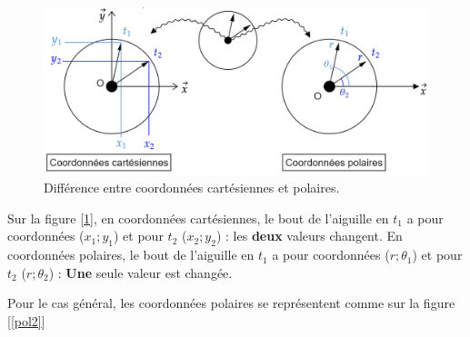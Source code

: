 \documentclass[
	11pt, %
	fleqn, %
	a4paper, %
]{LegrandOrangeBook}
\begin{document}
\begin{figure}[H] %
	\centering %
	\includegraphics[width=1\textwidth]{Images/pol1.png} %
	\caption{Différence entre coordonnées cartésiennes et polaires.}
	\label{pol1} %
\end{figure}

Sur la figure [\ref{pol1}], en coordonnées cartésiennes, le bout de l'aiguille en $t_1$ a pour coordonnées ($x_1; y_1$) et pour $t_2$ ($x_2 ; y_2$) : les \textbf{deux} valeurs changent. 
En coordonnées polaires, le bout de l'aiguille en $t_1$ a pour coordonnées ($r ; \theta_1$) et pour $t_2$ ($r ; \theta_2 $) : \textbf{Une} seule valeur est changée.

Pour le cas général, les coordonnées polaires se représentent comme sur la figure [\ref{pol2}]
\end{document}
